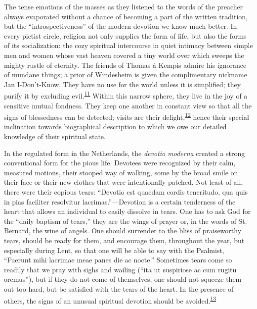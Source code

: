 The tense emotions of the masses as they listened to the words of the
preacher always evaporated without a chance of becoming a part of the
written tradition, but the ``introspectiveness'' of the modern devotion
we know much better. In every pietist circle, religion not only supplies
the form of life, but also the forms of its socialization: the cozy
spiritual intercourse in quiet intimacy between simple men and women
whose vast heaven covered a tiny world over which sweeps the mighty
rustle of eternity. The friends of Thomas à Kempis admire his ignorance
of mundane things; a prior of Windesheim is given the complimentary
nickname Jan I-Don't-Know. They have no use for the world unless it is
simplified; they purify it by excluding
evil.\textsuperscript{\protect\hypertarget{15_Chapter_Eight__RELIGIOUS_EXCITAT.xhtmlux5cux23id_885}{\protect\hyperlink{23_NOTES.xhtmlux5cux23id_886}{11}}}
Within this narrow sphere, they live in the joy of a sensitive mutual
fondness. They keep one another in constant view so that all the signs
of blessedness can be detected; visits are their
delight,\textsuperscript{\protect\hypertarget{15_Chapter_Eight__RELIGIOUS_EXCITAT.xhtmlux5cux23id_883}{\protect\hyperlink{23_NOTES.xhtmlux5cux23id_884}{12}}}
hence their special inclination towards biographical description to
which we owe our detailed knowledge of their spiritual state.

In the regulated form in the Netherlands, the \emph{devotio moderna}
created a strong conventional form for the pious life. Devotees were
recognized by their calm, measured motions, their stooped way of
walking, some by the broad smile on their face or their new clothes that
were intentionally patched. Not least of all, there were their copious
tears: ``Devotio est quaedam cordis teneritudo, qua quis in pias
faciliter resolvitur lacrimas.''---Devotion is a certain tenderness of
the heart that allows an individual to easily dissolve in tears. One has
to ask God for the ``daily baptism of tears,'' they are the wings of
prayer or, in the words of St. Bernard, the wine of angels. One should
surrender to the bliss of praiseworthy tears, should be ready for them,
and encourage them, throughout
\protect\hypertarget{15_Chapter_Eight__RELIGIOUS_EXCITAT.xhtmlux5cux23page_223}{}{}the
year, but especially during Lent, so that one will be able to say with
the Psalmist, ``Fuerunt mihi lacrimae meae panes die ac nocte.''
Sometimes tears come so readily that we pray with sighs and wailing
(``ita ut suspiriose ac cum rugitu oremus''), but if they do not come of
themselves, one should not squeeze them out too hard, but be satisfied
with the tears of the heart. In the presence of others, the signs of an
unusual spiritual devotion should be
avoided.\textsuperscript{\protect\hypertarget{15_Chapter_Eight__RELIGIOUS_EXCITAT.xhtmlux5cux23id_881}{\protect\hyperlink{23_NOTES.xhtmlux5cux23id_882}{13}}}

